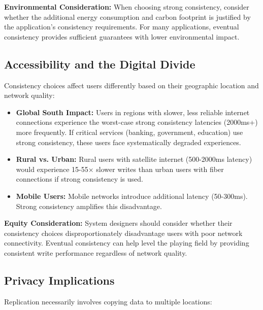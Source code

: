 \documentclass[10pt,a4paper]{article}
\begin{document}
\textbf{Environmental Consideration:} When choosing strong consistency, consider whether the additional energy consumption and carbon footprint is justified by the application's consistency requirements. For many applications, eventual consistency provides sufficient guarantees with lower environmental impact.

\subsection{Accessibility and the Digital Divide}

Consistency choices affect users differently based on their geographic location and network quality:

\begin{itemize}
    \item \textbf{Global South Impact:} Users in regions with slower, less reliable internet connections experience the worst-case strong consistency latencies (2000ms+) more frequently. If critical services (banking, government, education) use strong consistency, these users face systematically degraded experiences.
    
    \item \textbf{Rural vs. Urban:} Rural users with satellite internet (500-2000ms latency) would experience 15-55× slower writes than urban users with fiber connections if strong consistency is used.
    
    \item \textbf{Mobile Users:} Mobile networks introduce additional latency (50-300ms). Strong consistency amplifies this disadvantage.
\end{itemize}

\textbf{Equity Consideration:} System designers should consider whether their consistency choices disproportionately disadvantage users with poor network connectivity. Eventual consistency can help level the playing field by providing consistent write performance regardless of network quality.

\subsection{Privacy Implications}

Replication necessarily involves copying data to multiple locations:
\end{document}
